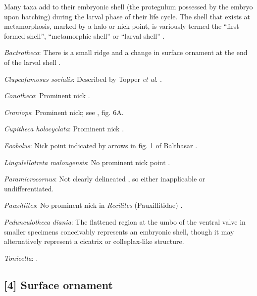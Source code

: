 \documentclass[openany]{book}
\begin{document}
Many taxa add to their embryonic shell (the protegulum possessed by the
embryo upon hatching) during the larval phase of their life cycle. The
shell that exists at metamorphosis, marked by a halo or nick point, is
variously termed the ``first formed shell'', ``metamorphic shell'' or
``larval shell'' \citep{Bassett2017Earliestontogeny}.

\hypertarget{Bactrotheca-coding-3}{}
\emph{Bactrotheca}: There is a small ridge and a change in surface
ornament at the end of the larval shell \citep{Dzik1980Ontogenyof}.

\hypertarget{Clupeafumosus_socialis-coding-3}{}
\emph{Clupeafumosus socialis}: Described by Topper \emph{et al}.
\citeyearpar{Topper2013Reappraisalof}.

\hypertarget{Conotheca-coding-3}{}
\emph{Conotheca}: Prominent nick \citep[figs 5G-H, 6a1]{Wrona2003}.

\hypertarget{Craniops-coding-3}{}
\emph{Craniops}: Prominent nick; see \citet{Freeman1999Changesin}, fig.
6A.

\hypertarget{Cupitheca_holocyclata-coding-3}{}
\emph{Cupitheca holocyclata}: Prominent nick \citep{Skovsted2016}.

\hypertarget{Eoobolus-coding-3}{}
\emph{Eoobolus}: Nick point indicated by arrows in fig. 1 of Balthasar
\citeyearpar{Balthasar2009Thebrachiopod}.

\hypertarget{Lingulellotreta_malongensis-coding-3}{}
\emph{Lingulellotreta malongensis}: No prominent nick point
\citep{Holmer1997EarlyCambrian, Li2004}.

\hypertarget{Paramicrocornus-coding-3}{}
\emph{Paramicrocornus}: Not clearly delineated
\citep{Zhang2018Ahyolithid}, so either inapplicable or undifferentiated.

\hypertarget{Pauxillites-coding-3}{}
\emph{Pauxillites}: No prominent nick in \emph{Recilites}
(Pauxillitidae) \citep{Dzik1978}.

\hypertarget{Pedunculotheca_diania-coding-3}{}
\emph{Pedunculotheca diania}: The flattened region at the umbo of the
ventral valve in smaller specimens conceivably represents an embryonic
shell, though it may alternatively represent a cicatrix or
colleplax-like structure.

\hypertarget{Tonicella-coding-3}{}
\emph{Tonicella}: \citet{Wanninger2002C}.

\subsection*{{[}4{]} Surface ornament}\label{surface-ornament}
\end{document}
